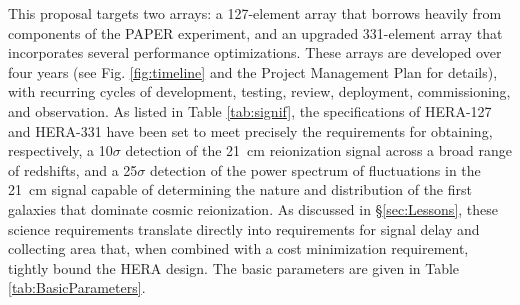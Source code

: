 \documentclass[ars]{/Users/daviddeboer1/Documents/Papers/Copernicus_LaTeX_Package_v_2_7/copernicus}
\begin{document}
This proposal targets two arrays: a 127-element array that borrows heavily
from components of the PAPER experiment, and an upgraded 331-element array that
incorporates several performance optimizations.  
These arrays are developed over four years (see Fig. \ref{fig:timeline} and the Project Management Plan for details),
with recurring cycles of development, testing, review, deployment, commissioning, and observation.
As listed in Table \ref{tab:signif}, the specifications of HERA-127
and HERA-331 have been set to meet precisely the requirements for obtaining,
respectively, a 10$\sigma$ detection of the 21~cm reionization signal across a broad range of redshifts, and a
25$\sigma$ detection of the power spectrum of fluctuations in the 21~cm signal
capable of determining the nature and distribution of the first galaxies that
dominate cosmic reionization.  
As discussed in
\S\ref{sec:Lessons}, these science requirements translate directly into
requirements for signal delay and collecting area that, when 
combined with a cost minimization requirement, tightly
bound the HERA design.  The basic parameters are given in Table \ref{tab:BasicParameters}.
\end{document}

